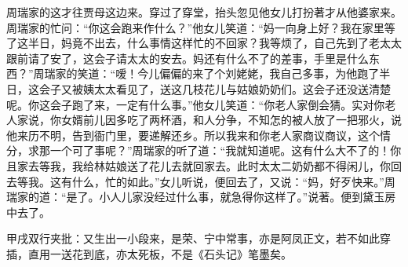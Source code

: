 \begin{parag}
    周瑞家的这才往贾母这边来。穿过了穿堂，抬头忽见他女儿打扮著才从他婆家来。周瑞家的忙问：“你这会跑来作什么？”他女儿笑道：“妈一向身上好？我在家里等了这半日，妈竟不出去，什么事情这样忙的不回家？我等烦了，自己先到了老太太跟前请了安了，这会子请太太的安去。妈还有什么不了的差事，手里是什么东西？”周瑞家的笑道：“嗳！今儿偏偏的来了个刘姥姥，我自己多事，为他跑了半日，这会子又被姨太太看见了，送这几枝花儿与姑娘奶奶们。这会子还没送清楚呢。你这会子跑了来，一定有什么事。”他女儿笑道：“你老人家倒会猜。实对你老人家说，你女婿前儿因多吃了两杯酒，和人分争，不知怎的被人放了一把邪火，说他来历不明，告到衙门里，要递解还乡。所以我来和你老人家商议商议，这个情分，求那一个可了事呢？”周瑞家的听了道：“我就知道呢。这有什么大不了的！你且家去等我，我给林姑娘送了花儿去就回家去。此时太太二奶奶都不得闲儿，你回去等我。这有什么，忙的如此。”女儿听说，便回去了，又说：“妈，好歹快来。”周瑞家的道：“是了。小人儿家没经过什么事，就急得你这样了。”说著。便到黛玉房中去了。\begin{note}甲戌双行夹批：又生出一小段来，是荣、宁中常事，亦是阿凤正文，若不如此穿插，直用一送花到底，亦太死板，不是《石头记》笔墨矣。\end{note}
\end{parag}


